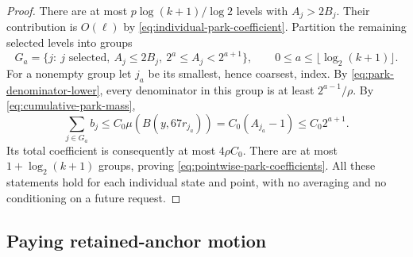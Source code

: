 \begin{proof}
There are at most $p\log(k+1)/\log2$ levels with $A_j>2B_j$.
Their contribution is $O(\ell)$ by
\eqref{eq:individual-park-coefficient}.  Partition the remaining
selected levels into groups
\[
 G_a=\{j:\ j\text{ selected},\ A_j\le2B_j,
                         \ 2^a\le A_j<2^{a+1}\},
 \qquad 0\le a\le\lfloor\log_2(k+1)\rfloor.
\]
For a nonempty group let $j_a$ be its smallest, hence coarsest, index.
By \eqref{eq:park-denominator-lower}, every denominator in this group
is at least $2^{a-1}/\rho$.  By
\eqref{eq:cumulative-park-mass},
\[
 \sum_{j\in G_a}b_j
  \le C_0\mu(B(y,67r_{j_a}))
  =C_0(A_{j_a}-1)\le C_0 2^{a+1}.
\]
Its total coefficient is consequently at most $4\rho C_0$.  There are
at most $1+\log_2(k+1)$ groups, proving
\eqref{eq:pointwise-park-coefficients}.  All these statements hold for
each individual state and point, with no averaging and no conditioning
on a future request.
\end{proof}

\subsection{Paying retained-anchor motion}

